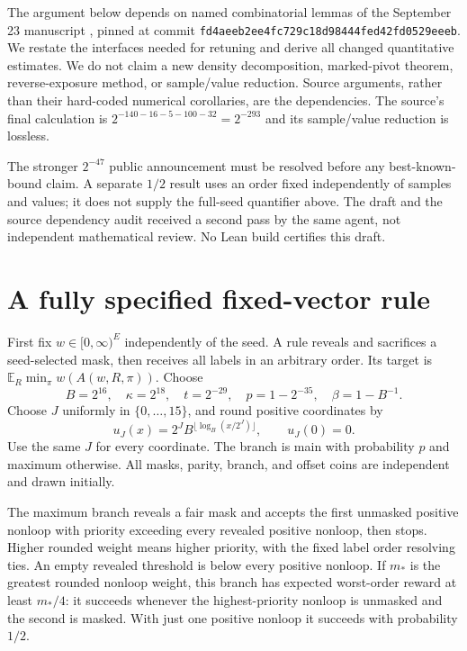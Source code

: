 \documentclass[11pt]{article}
\newcommand{\E}{\mathbb E}
\newcommand{\Src}{\cite{source}}
\begin{document}
The argument below depends on named combinatorial lemmas of the
September 23 manuscript \Src, pinned at commit
\texttt{fd4aeeb2ee4fc729c18d98444fed42fd0529eeeb}.
We restate the interfaces needed for retuning and derive all changed
quantitative estimates. We do not claim a new density decomposition,
marked-pivot theorem, reverse-exposure method, or sample/value reduction.
Source arguments, rather than their hard-coded numerical corollaries,
are the dependencies. The source's final calculation is
$2^{-140-16-5-100-32}=2^{-293}$ and its sample/value reduction is lossless.

The stronger $2^{-47}$ public announcement \cite{announcement} must be
resolved before any best-known-bound claim. A separate $1/2$ result
\cite{abhm} uses an order fixed independently of samples and values;
it does not supply the full-seed quantifier above. The draft and the
source dependency audit received a second pass by the same agent,
not independent mathematical review. No Lean build certifies this draft.

\section{A fully specified fixed-vector rule}

First fix $w\in[0,\infty)^E$ independently of the seed. A rule reveals
and sacrifices a seed-selected mask, then receives all labels in an
arbitrary order. Its target is $\E_R\min_\pi w(A(w,R,\pi))$.
Choose
\begin{equation}\label{eq:params}
 B=2^{16},\quad \kappa=2^{18},\quad t=2^{-29},\quad
 p=1-2^{-35},\quad \beta=1-B^{-1}.
\end{equation}
Choose $J$ uniformly in $\{0,\ldots,15\}$, and round positive coordinates by
\[
 u_J(x)=2^J B^{\lfloor\log_B(x/2^J)\rfloor},\qquad u_J(0)=0.
\]
Use the same $J$ for every coordinate. The branch is main with
probability $p$ and maximum otherwise. All masks, parity, branch, and
offset coins are independent and drawn initially.

The maximum branch reveals a fair mask and accepts the first unmasked
positive nonloop with priority exceeding every revealed positive
nonloop, then stops. Higher rounded weight means higher priority,
with the fixed label order resolving ties. An empty revealed threshold
is below every positive nonloop. If $m_*$ is the greatest rounded
nonloop weight, this branch has expected worst-order reward at least
$m_*/4$: it succeeds whenever the highest-priority nonloop is unmasked
and the second is masked. With just one positive nonloop it succeeds
with probability $1/2$.
\end{document}
